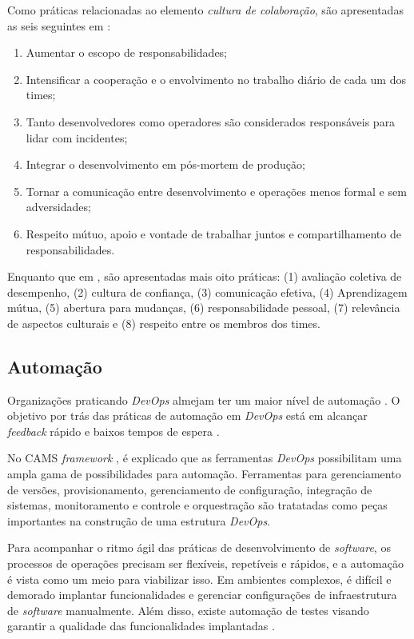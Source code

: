 Como práticas relacionadas ao elemento \emph{cultura de colaboração}, são
apresentadas as seis seguintes em \cite{extending_dimensions}:

\begin{enumerate}
\item Aumentar o escopo de responsabilidades;
\item Intensificar a cooperação e o envolvimento no trabalho diário de cada um
dos times;
\item Tanto desenvolvedores como operadores são considerados responsáveis para
lidar com incidentes;
\item Integrar o desenvolvimento em pós-mortem de produção;
\item Tornar a comunicação entre desenvolvimento e operações menos formal e
sem adversidades;
\item Respeito mútuo, apoio e vontade de trabalhar juntos e compartilhamento
de responsabilidades.
\end{enumerate}

Enquanto que em \cite{characterizing_devops}, são apresentadas mais oito
práticas: (1) avaliação coletiva de desempenho, (2) cultura de confiança, (3)
comunicação efetiva, (4) Aprendizagem mútua, (5) abertura para mudanças, (6)
responsabilidade pessoal, (7) relevância de aspectos culturais e (8) respeito
entre os membros dos times.

\subsection{Automação}

Organizações praticando \textit{DevOps} almejam ter um maior nível de automação
\cite{qualitative_devops_journalsw_17}. O objetivo por trás das práticas de
automação em {\it DevOps} está em alcançar {\it feedback} rápido e baixos
tempos de espera \cite{challenges_in_adopting_devops}.

No \acrshort{CAMS} \textit{framework} \cite{what_devops_means_2010}, é explicado
que as ferramentas \textit{DevOps} possibilitam uma ampla gama de possibilidades
para automação. Ferramentas para gerenciamento de versões, provisionamento,
gerenciamento de configuração, integração de sistemas, monitoramento e controle
e orquestração são tratatadas como peças importantes na construção de uma
estrutura \textit{DevOps}.

Para acompanhar o ritmo ágil das práticas de desenvolvimento de \textit{software}, os
processos de operações precisam ser flexíveis, repetíveis e rápidos, e a
automação é vista como um meio para viabilizar isso. Em ambientes complexos,
é difícil e demorado implantar funcionalidades e gerenciar configurações de
infraestrutura de \textit{software} manualmente. Além disso, existe automação
de testes visando garantir a qualidade das funcionalidades implantadas
\cite{dimensions_of_devops,extending_dimensions}.

